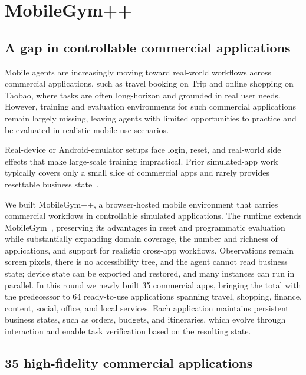 
\section{MobileGym++}
\label{sec:mobilegym++}
\label{sec:method}

\subsection{A gap in controllable commercial applications}
\label{sec:mgpp-env}

Mobile agents are increasingly moving toward real-world workflows across commercial applications, such as travel booking on Trip and online shopping on Taobao, where tasks are often long-horizon and grounded in real user needs. However, training and evaluation environments for such commercial applications remain largely missing, leaving agents with limited opportunities to practice and be evaluated in realistic mobile-use scenarios.

Real-device or Android-emulator setups face login, reset, and real-world side effects that make large-scale training impractical. Prior simulated-app work typically covers only a small slice of commercial apps and rarely provides resettable business state~\citep{rawles2025androidworld,kong2025mobileworld}.

We built MobileGym++, a browser-hosted mobile environment that carries commercial workflows in controllable simulated applications. The runtime extends MobileGym~\citep{wu2026mobilegym}, preserving its advantages in reset and programmatic evaluation while substantially expanding domain coverage, the number and richness of applications, and support for realistic cross-app workflows. Observations remain screen pixels, there is no accessibility tree, and the agent cannot read business state; device state can be exported and restored, and many instances can run in parallel. In this round we newly built 35 commercial apps, bringing the total with the predecessor to 64 ready-to-use applications spanning travel, shopping, finance, content, social, office, and local services. Each application maintains persistent business states, such as orders, budgets, and itineraries, which evolve through interaction and enable task verification based on the resulting state.

\subsection{35 high-fidelity commercial applications}
\label{sec:mgpp-apps}

